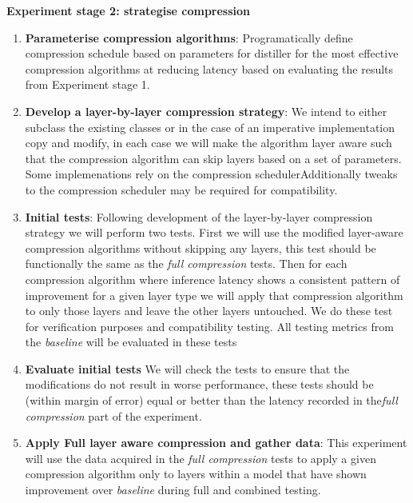 \documentclass[../../D1.tex]{subfiles}
\begin{document}
\textbf{Experiment stage 2: strategise compression}
\begin{enumerate}
    \item \textbf{Parameterise compression algorithms}: Programatically define compression schedule based on parameters for distiller for the most effective compression algorithms at reducing latency based on evaluating the results from Experiment stage 1.
    \item \textbf{Develop a layer-by-layer compression strategy}: We intend to either subclass the existing classes or in the case of an imperative implementation copy and modify, in each case we will make the algorithm layer aware such that the compression algorithm can skip layers based on a set of parameters. Some implemenations rely on the compression schedulerAdditionally tweaks to the compression scheduler may be required for compatibility.
    \item \textbf{Initial tests}: Following development of the layer-by-layer compression strategy we will perform two tests. First we will use the modified layer-aware compression algorithms without skipping any layers, this test should be functionally the same as the \emph{full compression} tests. Then for each compression algorithm where inference latency shows a consistent pattern of improvement for a given layer type we will apply that compression algorithm to only those layers and leave the other layers untouched. We do these test for verification purposes and compatibility testing. All testing metrics from the \emph{baseline} will be evaluated in these tests
    \item \textbf{Evaluate initial tests} We will check the tests to ensure that the modifications do not result in worse performance, these tests should be (within margin of error) equal or better than the latency recorded in the\emph{full compression} part of the experiment.
    \item \textbf{Apply Full layer aware compression and gather data}: This experiment will use the data acquired in the \emph{full compression} tests to apply a given compression algorithm only to layers within a model that have shown improvement over \emph{baseline} during full and combined testing.
\end{enumerate}
\end{document}
